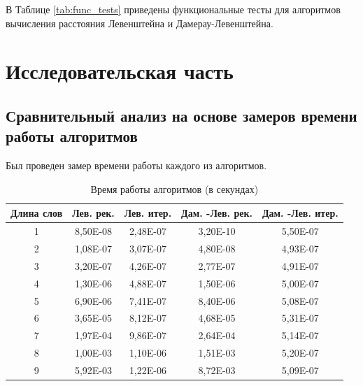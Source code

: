 \documentclass[12pt]{report}
\begin{document}
В Таблице \ref{tab:func_tests} приведены функциональные тесты для алгоритмов вычисления расстояния Левенштейна и Дамерау-Левенштейна.

\chapter{Исследовательская часть}

\section{Сравнительный анализ на основе замеров времени работы алгоритмов}

Был проведен замер времени работы каждого из алгоритмов.

\begin{table}[h]
	\centering
	\begin{tabular}{ccccc}
	\multicolumn{1}{l}{Длина слов} &
	  \multicolumn{1}{l}{Лев. рек.} &
	  \multicolumn{1}{l}{Лев. итер.} &
	  \multicolumn{1}{l}{Дам. -Лев. рек.} &
	  \multicolumn{1}{l}{Дам. -Лев. итер.} \\ \hline
	\multicolumn{1}{|c|}{1} & \multicolumn{1}{c|}{8,50E-08} & \multicolumn{1}{c|}{2,48E-07} & \multicolumn{1}{c|}{3,20E-10} & \multicolumn{1}{c|}{5,50E-07} \\ \hline
	\multicolumn{1}{|c|}{2} & \multicolumn{1}{c|}{1,08E-07} & \multicolumn{1}{c|}{3,07E-07} & \multicolumn{1}{c|}{4,80E-08} & \multicolumn{1}{c|}{4,93E-07} \\ \hline
	\multicolumn{1}{|c|}{3} & \multicolumn{1}{c|}{3,20E-07} & \multicolumn{1}{c|}{4,26E-07} & \multicolumn{1}{c|}{2,77E-07} & \multicolumn{1}{c|}{4,91E-07} \\ \hline
	\multicolumn{1}{|c|}{4} & \multicolumn{1}{c|}{1,30E-06} & \multicolumn{1}{c|}{4,88E-07} & \multicolumn{1}{c|}{1,50E-06} & \multicolumn{1}{c|}{5,00E-07} \\ \hline
	\multicolumn{1}{|c|}{5} & \multicolumn{1}{c|}{6,90E-06} & \multicolumn{1}{c|}{7,41E-07} & \multicolumn{1}{c|}{8,40E-06} & \multicolumn{1}{c|}{5,08E-07} \\ \hline
	\multicolumn{1}{|c|}{6} & \multicolumn{1}{c|}{3,65E-05} & \multicolumn{1}{c|}{8,12E-07} & \multicolumn{1}{c|}{4,68E-05} & \multicolumn{1}{c|}{5,31E-07} \\ \hline
	\multicolumn{1}{|c|}{7} & \multicolumn{1}{c|}{1,97E-04} & \multicolumn{1}{c|}{9,86E-07} & \multicolumn{1}{c|}{2,64E-04} & \multicolumn{1}{c|}{5,14E-07} \\ \hline
	\multicolumn{1}{|c|}{8} & \multicolumn{1}{c|}{1,00E-03} & \multicolumn{1}{c|}{1,10E-06} & \multicolumn{1}{c|}{1,51E-03} & \multicolumn{1}{c|}{5,20E-07} \\ \hline
	\multicolumn{1}{|c|}{9} & \multicolumn{1}{c|}{5,92E-03} & \multicolumn{1}{c|}{1,22E-06} & \multicolumn{1}{c|}{8,72E-03} & \multicolumn{1}{c|}{5,09E-07} \\ \hline
	\end{tabular}
	\caption{Время работы алгоритмов (в секундах)}
	\label{tab:my-table}
	\end{table}
\end{document}
